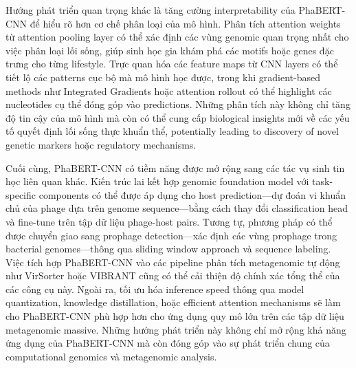 Hướng phát triển quan trọng khác là tăng cường interpretability của PhaBERT-CNN để hiểu rõ hơn cơ chế phân loại của mô hình. Phân tích attention weights từ attention pooling layer có thể xác định các vùng genomic quan trọng nhất cho việc phân loại lối sống, giúp sinh học gia khám phá các motifs hoặc genes đặc trưng cho từng lifestyle. Trực quan hóa các feature maps từ CNN layers có thể tiết lộ các patterns cục bộ mà mô hình học được, trong khi gradient-based methods như Integrated Gradients hoặc attention rollout có thể highlight các nucleotides cụ thể đóng góp vào predictions. Những phân tích này không chỉ tăng độ tin cậy của mô hình mà còn có thể cung cấp biological insights mới về các yếu tố quyết định lối sống thực khuẩn thể, potentially leading to discovery of novel genetic markers hoặc regulatory mechanisms.

Cuối cùng, PhaBERT-CNN có tiềm năng được mở rộng sang các tác vụ sinh tin học liên quan khác. Kiến trúc lai kết hợp genomic foundation model với task-specific components có thể được áp dụng cho host prediction—dự đoán vi khuẩn chủ của phage dựa trên genome sequence—bằng cách thay đổi classification head và fine-tune trên tập dữ liệu phage-host pairs. Tương tự, phương pháp có thể được chuyển giao sang prophage detection—xác định các vùng prophage trong bacterial genomes—thông qua sliding window approach và sequence labeling. Việc tích hợp PhaBERT-CNN vào các pipeline phân tích metagenomic tự động như VirSorter hoặc VIBRANT cũng có thể cải thiện độ chính xác tổng thể của các công cụ này. Ngoài ra, tối ưu hóa inference speed thông qua model quantization, knowledge distillation, hoặc efficient attention mechanisms sẽ làm cho PhaBERT-CNN phù hợp hơn cho ứng dụng quy mô lớn trên các tập dữ liệu metagenomic massive. Những hướng phát triển này không chỉ mở rộng khả năng ứng dụng của PhaBERT-CNN mà còn đóng góp vào sự phát triển chung của computational genomics và metagenomic analysis.
